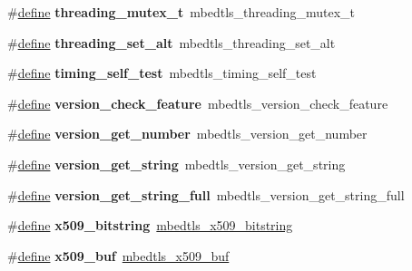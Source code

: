 \begin{DoxyCompactItemize}
\mbox{\label{compat-1_83_8h_aabe46e83dcbbe30dd4ca9c53c82e5493}} 
\#\hyperlink{structdefine}{define} {\bfseries threading\+\_\+mutex\+\_\+t}~mbedtls\+\_\+threading\+\_\+mutex\+\_\+t
\item 
\mbox{\label{compat-1_83_8h_a9ceaca45f3c3f4ce7e306e03bf226755}} 
\#\hyperlink{structdefine}{define} {\bfseries threading\+\_\+set\+\_\+alt}~mbedtls\+\_\+threading\+\_\+set\+\_\+alt
\item 
\mbox{\label{compat-1_83_8h_a08fcd4b1b245ec91d84571d657cea1ef}} 
\#\hyperlink{structdefine}{define} {\bfseries timing\+\_\+self\+\_\+test}~mbedtls\+\_\+timing\+\_\+self\+\_\+test
\item 
\mbox{\label{compat-1_83_8h_a871dd9649c48464cb27bdc6c71673425}} 
\#\hyperlink{structdefine}{define} {\bfseries version\+\_\+check\+\_\+feature}~mbedtls\+\_\+version\+\_\+check\+\_\+feature
\item 
\mbox{\label{compat-1_83_8h_a9d998746019e4445ee3b9b4a24f80a1d}} 
\#\hyperlink{structdefine}{define} {\bfseries version\+\_\+get\+\_\+number}~mbedtls\+\_\+version\+\_\+get\+\_\+number
\item 
\mbox{\label{compat-1_83_8h_ad0a99004a5b9e72ee73ca83232bf7239}} 
\#\hyperlink{structdefine}{define} {\bfseries version\+\_\+get\+\_\+string}~mbedtls\+\_\+version\+\_\+get\+\_\+string
\item 
\mbox{\label{compat-1_83_8h_a4ade7ab628ab65cf9a7a2be00218811d}} 
\#\hyperlink{structdefine}{define} {\bfseries version\+\_\+get\+\_\+string\+\_\+full}~mbedtls\+\_\+version\+\_\+get\+\_\+string\+\_\+full
\item 
\mbox{\label{compat-1_83_8h_af2c7687bb5d4bc30de8aa4ad1cade751}} 
\#\hyperlink{structdefine}{define} {\bfseries x509\+\_\+bitstring}~\hyperlink{group__x509__module_gaf25a97602f25027e160f22f6d5590636}{mbedtls\+\_\+x509\+\_\+bitstring}
\item 
\mbox{\label{compat-1_83_8h_a70fe40b44e1b684215e6b7ac7d32de14}} 
\#\hyperlink{structdefine}{define} {\bfseries x509\+\_\+buf}~\hyperlink{group__x509__module_ga4d02c9e8e4e2934555e0d132cd2976dc}{mbedtls\+\_\+x509\+\_\+buf}

\end{DoxyCompactItemize}
